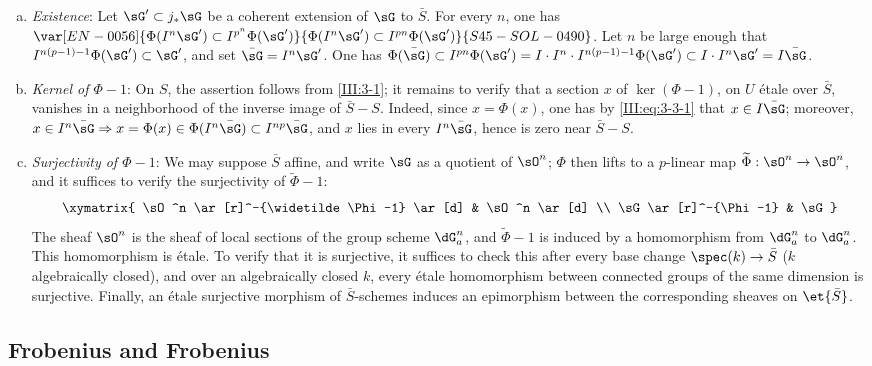 \begin{enumerate}[a)]
  \item \emph{Existence}: Let $\sG'\subset j_*\sG$ be a coherent extension
    of $\sG$ to $\bar S$. For every $n$, one has
    $\var[EN-0056]{\Phi(I^n \sG')\subset I^{p^n}\Phi(\sG')}{\Phi(I^n \sG')\subset I^{p n}\Phi(\sG')}{S45-SOL-0490}$. Let $n$ be large enough that
    $I^{n(p-1)-1}\Phi(\sG')\subset \sG'$, and set $\bar\sG=I^n\sG'$.
    One has $\Phi(\bar\sG)\subset I^{p n}\Phi(\sG')
    =I\cdot I^n\cdot I^{n(p-1)-1}\Phi(\sG')\subset I\cdot I^n\sG'
    = I\bar\sG$.
  \item {}\emph{Kernel of $\Phi-1$}: On $S$, the assertion follows from
    \ref{III:3-1}; it remains to verify that a section $x$ of
    $\ker(\Phi-1)$, on $U$ étale over $\bar S$, vanishes in a neighborhood of
    the inverse image of $\bar S-S$. Indeed, since $x=\Phi(x)$, one
    has by \eqref{III:eq:3-3-1} that $x\in I\bar\sG$; moreover,
    $x\in I^n\bar\sG\Rightarrow x=\Phi(x)\in\Phi(I^n\bar\sG)\subset I^{n p}\bar\sG$, and $x$ lies in every $I^n\bar\sG$, hence is zero near $\bar S-S$.
  \item \emph{Surjectivity of $\Phi-1$}: We may suppose $\bar S$ affine, and
    write $\sG$ as a quotient of $\sO^n$; $\Phi$ then lifts to a $p$-linear
    map $\widetilde\Phi:\sO^n\to\sO^n$, and it suffices to verify the
    surjectivity of $\widetilde\Phi-1$:
    \[\xymatrix{
      \sO^n \ar[r]^-{\widetilde \Phi-1} \ar[d]
        & \sO^n \ar[d] \\
      \sG \ar[r]^-{\Phi-1}
        & \sG
    }\]
    The sheaf $\sO^n$ is the sheaf of local sections of the group scheme
    $\dG_a^n$, and $\widetilde\Phi-1$ is induced by a homomorphism from
    $\dG_a^n$ to $\dG_a^n$. This homomorphism is étale. To verify that it is
    surjective, it suffices to check this after every base change
    $\spec(k)\to\bar S$ ($k$ algebraically closed), and over an algebraically
    closed $k$, every étale homomorphism between connected groups of the same
    dimension is surjective. Finally, an étale surjective morphism of
    $\bar S$-schemes induces an epimorphism between the corresponding sheaves
    on $\et{\bar S}$.
\end{enumerate}






\subsection{Frobenius and Frobenius}\label{III:3-4}

